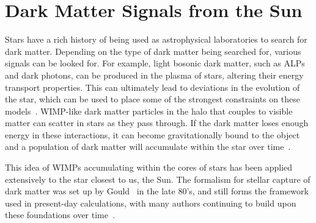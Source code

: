 \section{Dark Matter Signals from the Sun}
\label{ch1:sec:solar_signals}

Stars have a rich history of being used as astrophysical laboratories to search for dark matter. Depending on the type of dark matter being searched for, various signals can be looked for.
For example, light bosonic dark matter, such as ALPs and dark photons, can be produced in the plasma of stars, altering their energy transport properties.
This can ultimately lead to deviations in the evolution of the star, which can be used to place some of the strongest constraints on these models~\cite{An:2013yfc_oct_Newstellarconstraints, Dolan:2022kul_oct_Advancingglobularcluster, Dolan:2023cjs_jun_ConstrainingDarkPhotons}.
WIMP-like dark matter particles in the halo that couples to visible matter can scatter in stars as they pass through. 
If the dark matter loses enough energy in these interactions, it can become gravitationally bound to the object and a population of dark matter will accumulate within the star over time~\cite{Press:1985ug_Capturesungalactic, Gould:1987ju_WeaklyInteractingMassive, Gould:1987ir_ResonantEnhancementsWIMP, Jungman:1995df_Supersymmetricdarkmatter, Busoni:2017mhe_oct_Evaporationscatteringmomentum}. 

This idea of WIMPs accumulating within the cores of stars has been applied extensively to the star closest to us, the Sun. The formalism for stellar capture of dark matter was set up by Gould~\cite{Gould:1987ir_ResonantEnhancementsWIMP, Gould:1987ju_WeaklyInteractingMassive,Gould:1991va_Bigbangarcheology} in the late 80's, and still forms the framework used in present-day calculations, with many authors continuing to build upon these foundations over time~\cite{Busoni:2017mhe_oct_Evaporationscatteringmomentum,Garani:2017jcj_may_DarkmatterSun,Bramante:2017xlb_sep_Multiscatterstellarcapture}.

